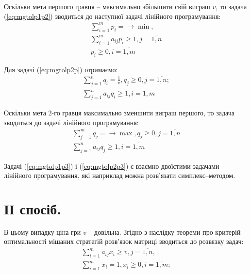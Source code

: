 \documentclass[12pt,a4paper]{report}
\begin{document}
Оскільки мета першого гравця – максимально збільшити свій виграш $v$, то задача (\ref{eq:mgtolp1p2}) зводиться до наступної задачі лінійного програмування:
\begin{equation}
\begin{array}{l}
\displaystyle \sum_{i=1}^m p_i = \to \min,\\
\displaystyle \sum_{i=1}^m a_{ij} p_i \geq 1,  j=\overline{1,n}\\
p_i \geq 0, i=\overline{1,m}
\end{array}
\label{eq:mgtolp1p3}
\end{equation}

Для задачі (\ref{eq:mgtolp2p}) отримаємо:
\begin{equation}
\begin{array}{l}
\displaystyle \sum_{j=1}^n q_i = \frac{1}{v}, q_j \geq 0, j=\overline{1,n};\\
\displaystyle \sum_{j=1}^n a_{ij} q_i \geq 1,  i=\overline{1,m}
\end{array}
\label{eq:mgtolp2p2}
\end{equation}

Оскільки мета 2-го гравця максимально зменшити виграш першого, то задача зводиться до задачі лінійного програмування:
\begin{equation}
\begin{array}{l}
\displaystyle \sum_{j=1}^m q_j = \to \max, q_j \geq 0, j=\overline{1,n}\\
\displaystyle \sum_{j=1}^n a_{ij} q_j \geq 1,  i=\overline{1,m}
\end{array}
\label{eq:mgtolp2p3}
\end{equation}

Задачі (\ref{eq:mgtolp1p3}) і (\ref{eq:mgtolp2p3}) є взаємно двоїстими задачами лінійного програмування, які наприклад можна розв’язати симплекс–методом.

\section{ІІ спосіб.}
В цьому випадку ціна гри $v$ – довільна. Згідно з наслідку теореми про критерій оптимальності мішаних стратегій розв’язок матриці зводиться до розвязку задач:
\begin{equation}
\begin{array}{l}
\displaystyle \sum_{i=1}^m a_{ij} x_i \geq v,  j=\overline{1,n},\\
\displaystyle \sum_{i=1}^m x_i = 1, x_i \geq 0, i=\overline{1,m};
\end{array}
\label{eq:mgtolp2w1p}
\end{equation}
\end{document}
